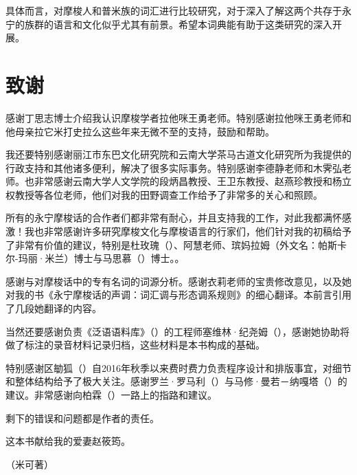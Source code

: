 具体而言，对摩梭人和普米族\parencite{daudey2014}的词汇进行比较研究，对于深入了解这两个共存于永宁的族群的语言和文化似乎尤其有前景。希望本词典能有助于这类研究的深入开展。


\section{致谢}

感谢丁思志博士介绍我认识摩梭学者拉他咪王勇老师。特别感谢拉他咪王勇老师和他母亲拉它米打史拉么这些年来无微不至的支持，鼓励和帮助。

我还要特别感谢丽江市东巴文化研究院和云南大学茶马古道文化研究所为我提供的行政支持和其他诸多便利，解决了很多实际事务。特别感谢李德静老师和木霁弘老师。也非常感谢云南大学人文学院的段炳昌教授、王卫东教授、赵燕珍教授和杨立权教授等各位老师，他们对我的田野调查工作给予了非常多的关心和照顾。

所有的永宁摩梭话的合作者们都非常有耐心，并且支持我的工作，对此我都满怀感激！我也非常感谢许多研究摩梭文化与摩梭语言的行家们，他们针对我的初稿给予了非常有价值的建议，特别是杜玫瑰（）、阿慧老师、瑸妈拉姆（外文名：帕斯卡尔-玛丽·米兰）博士与马思慕（）博士。\parencite[vi]{yliniemi_descriptive_2022}。

感谢与对摩梭话中的专有名词的词源分析。感谢衣莉老师的宝贵修改意见，以及她对我的书《永宁摩梭话的声调：词汇调与形态调系规则》的细心翻译。本前言引用了几段她翻译的内容。

当然还要感谢负责《泛语语料库》（）的工程师塞维林·纪尧姆（），感谢她协助将做了标注的录音材料记录归档，这些材料是本书构成的基础。

特别感谢区勄狐（）自2016年秋季以来费时费力负责程序设计和排版事宜，对细节和整体结构给予了极大关注。感谢罗兰·罗马利（）与马修·曼若－纳嘎塔（）的建议。非常感谢向柏霖（）一路上的指路和建议。



剩下的错误和问题都是作者的责任。

这本书献给我的爱妻赵筱筠。

{\raggedleft （米可著）\par}
